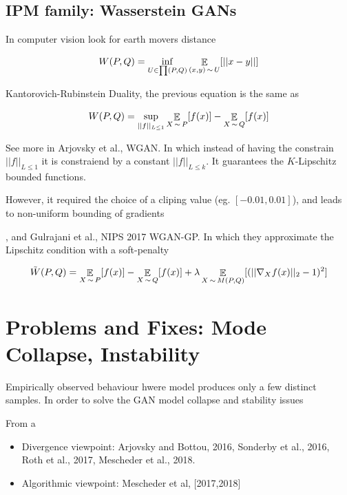 \documentclass[b5paper]{report}
\begin{document}
\subsection{IPM family: Wasserstein GANs}

In computer vision look for earth movers distance

\begin{equation}
  W(P,Q) = \inf_{U\in \prod (P,Q)} \operatorname*{\mathbb{\mathop{E}}}_{(x,y) \operatorname*{\sim} U} [||x-y||]
\end{equation}

Kantorovich-Rubinstein Duality, the previous equation is the same as

\begin{equation}
W(P,Q) = \sup_{||f||_{L \le 1}} \operatorname*{\mathbb{\mathop{E}}}_{X \operatorname*{\sim} P}[f(x)] -
\operatorname*{\mathbb{\mathop{E}}}_{X\operatorname*{\sim} Q} [f(x)]
\end{equation}

See more in Arjovsky et al., WGAN. In which instead of having the constrain
$||f||_{L \le 1}$ it is constraiend by a constant $||f||_{L \le k}$. It guarantees the
$K$-Lipschitz bounded functions.

However, it required the choice of a cliping value (eg. $[-0.01, 0.01]$), and
leads to non-uniform bounding of gradients

, and Gulrajani et al., NIPS 2017 WGAN-GP. In which they approximate the
Lipschitz condition with a soft-penalty

\begin{equation}
  \tilde{W}(P,Q) = \operatorname*{\mathbb{\mathop{E}}}_{X \operatorname*{\sim} P}[f(x)] - \operatorname*{\mathbb{\mathop{E}}}_{X\operatorname*{\sim} Q} [f(x)] +
  \lambda \operatorname*{\mathbb{\mathop{E}}}_{X \operatorname*{\sim} M(P,Q)} [(||\nabla_X f(x) ||_2 -1)^2]
\end{equation}

\section{Problems and Fixes: Mode Collapse, Instability}

Empirically observed behaviour hwere model produces only a few distinct
samples. In order to solve the GAN model collapse and stability issues

From a

\begin{itemize}
  \item Divergence viewpoint: Arjovsky and Bottou, 2016, Sonderby et al., 2016,
    Roth et al., 2017, Mescheder et al., 2018.
  \item Algorithmic viewpoint: Mescheder et al, [2017,2018]
\end{itemize}
\end{document}
